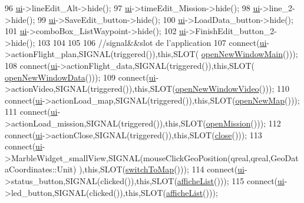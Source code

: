 \begin{DoxyCode}
96     \hyperlink{a00015_a4f4e978b71511ee6fcb91ef1a4e3c17c}{ui}->lineEdit\_Alt->hide();
97     \hyperlink{a00015_a4f4e978b71511ee6fcb91ef1a4e3c17c}{ui}->timeEdit\_Mission->hide();
98     \hyperlink{a00015_a4f4e978b71511ee6fcb91ef1a4e3c17c}{ui}->line\_2->hide();
99     \hyperlink{a00015_a4f4e978b71511ee6fcb91ef1a4e3c17c}{ui}->SaveEdit\_button->hide();
100     \hyperlink{a00015_a4f4e978b71511ee6fcb91ef1a4e3c17c}{ui}->LoadData\_button->hide();
101     \hyperlink{a00015_a4f4e978b71511ee6fcb91ef1a4e3c17c}{ui}->comboBox\_ListWaypoint->hide();
102     \hyperlink{a00015_a4f4e978b71511ee6fcb91ef1a4e3c17c}{ui}->FinishEdit\_button\_2->hide();
103 
104 
105 
106     \textcolor{comment}{//signal&&slot de l'application}
107     connect(\hyperlink{a00015_a4f4e978b71511ee6fcb91ef1a4e3c17c}{ui}->actionFlight\_plan,SIGNAL(triggered()),\textcolor{keyword}{this},SLOT(
      \hyperlink{a00015_a688b7983c0da36424d5b4d10a0c007f7}{openNewWindowMain}()));
108     connect(\hyperlink{a00015_a4f4e978b71511ee6fcb91ef1a4e3c17c}{ui}->actionFlight\_data,SIGNAL(triggered()),\textcolor{keyword}{this},SLOT(
      \hyperlink{a00015_a7d0835d5762ca85bc460aeeabca018c7}{openNewWindowData}()));
109     connect(\hyperlink{a00015_a4f4e978b71511ee6fcb91ef1a4e3c17c}{ui}->actionVideo,SIGNAL(triggered()),\textcolor{keyword}{this},SLOT(\hyperlink{a00015_a03f5e63773125e14f1e32c94420ff7bf}{openNewWindowVideo}()));
110     connect(\hyperlink{a00015_a4f4e978b71511ee6fcb91ef1a4e3c17c}{ui}->actionLoad\_map,SIGNAL(triggered()),\textcolor{keyword}{this},SLOT(\hyperlink{a00015_a7225d8cbcace3eaee988a9d7724c0dbd}{openNewMap}()));
111     connect(\hyperlink{a00015_a4f4e978b71511ee6fcb91ef1a4e3c17c}{ui}->actionLoad\_mission,SIGNAL(triggered()),\textcolor{keyword}{this},SLOT(\hyperlink{a00015_a489b8f1d983d32ae8b2e5d9e29aff63a}{openMission}()));
112     connect(\hyperlink{a00015_a4f4e978b71511ee6fcb91ef1a4e3c17c}{ui}->actionClose,SIGNAL(triggered()),\textcolor{keyword}{this},SLOT(\hyperlink{a00015_a5ae591df94fc66ccb85cbb6565368bca}{close}()));
113     connect(\hyperlink{a00015_a4f4e978b71511ee6fcb91ef1a4e3c17c}{ui}->MarbleWidget\_smallView,SIGNAL(mouseClickGeoPosition(qreal,qreal,GeoDataCoordinates::Unit)
      ),\textcolor{keyword}{this},SLOT(\hyperlink{a00015_ab8446a0b12406c07562af271392ab19b}{switchToMap}()));
114     connect(\hyperlink{a00015_a4f4e978b71511ee6fcb91ef1a4e3c17c}{ui}->status\_button,SIGNAL(clicked()),\textcolor{keyword}{this},SLOT(\hyperlink{a00015_ad0f7d75c8390ef3bfcc62ad26098dacc}{afficheList}()));
115     connect(\hyperlink{a00015_a4f4e978b71511ee6fcb91ef1a4e3c17c}{ui}->led\_button,SIGNAL(clicked()),\textcolor{keyword}{this},SLOT(\hyperlink{a00015_ad0f7d75c8390ef3bfcc62ad26098dacc}{afficheList}()));

\end{DoxyCode}
